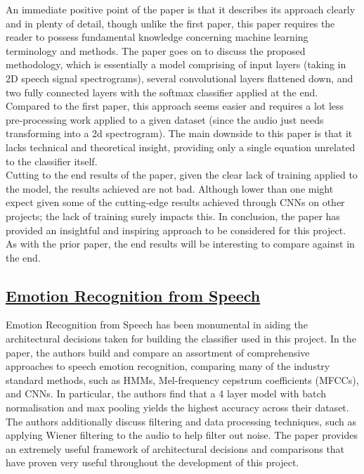 \documentclass[12pt]{article}
\begin{document}
\noindent An immediate positive point of the paper is that it describes its approach clearly and in plenty of detail, though unlike the first paper, this paper requires the reader to possess fundamental knowledge concerning machine learning terminology and methods. The paper goes on to discuss the proposed methodology, which is essentially a model comprising of input layers (taking in 2D speech signal spectrograms), several convolutional layers flattened down, and two fully connected layers with the softmax classifier applied at the end. Compared to the first paper, this approach seems easier and requires a lot less pre-processing work applied to a given dataset (since the audio just needs transforming into a 2d spectrogram). The main downside to this paper is that it lacks technical and theoretical insight, providing only a single equation unrelated to the classifier itself.
\\

\noindent Cutting to the end results of the paper, given the clear lack of training applied to the model, the results achieved are not bad. Although lower than one might expect given some of the cutting-edge results achieved through CNNs on other projects; the lack of training surely impacts this. In conclusion, the paper has provided an insightful and inspiring approach to be considered for this project. As with the prior paper, the end results will be interesting to compare against in the end.

\subsection{\href{https://arxiv.org/pdf/1912.10458.pdf}{Emotion Recognition from Speech}}
Emotion Recognition from Speech has been monumental in aiding the architectural decisions taken for building the classifier used in this project. In the paper, the authors build and compare an assortment of comprehensive approaches to speech emotion recognition, comparing many of the industry standard methods, such as HMMs, Mel-frequency cepstrum coefficients (MFCCs), and CNNs. In particular, the authors find that a 4 layer model with batch normalisation and max pooling yields the highest accuracy across their dataset. The authors additionally discuss filtering and data processing techniques, such as applying Wiener filtering to the audio to help filter out noise. The paper provides an extremely useful framework of architectural decisions and comparisons that have proven very useful throughout the development of this project. 
\end{document}
